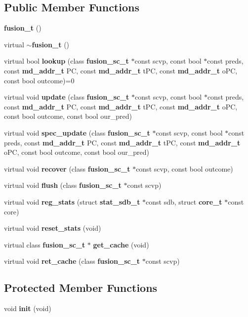 \subsection*{Public Member Functions}
\begin{CompactItemize}
\item 
{\bf fusion\_\-t} ()
\item 
virtual {\bf $\sim$fusion\_\-t} ()
\item 
virtual bool {\bf lookup} (class {\bf fusion\_\-sc\_\-t} $\ast$const scvp, const bool $\ast$const preds, const {\bf md\_\-addr\_\-t} PC, const {\bf md\_\-addr\_\-t} tPC, const {\bf md\_\-addr\_\-t} oPC, const bool outcome)=0
\item 
virtual void {\bf update} (class {\bf fusion\_\-sc\_\-t} $\ast$const scvp, const bool $\ast$const preds, const {\bf md\_\-addr\_\-t} PC, const {\bf md\_\-addr\_\-t} tPC, const {\bf md\_\-addr\_\-t} oPC, const bool outcome, const bool our\_\-pred)
\item 
virtual void {\bf spec\_\-update} (class {\bf fusion\_\-sc\_\-t} $\ast$const scvp, const bool $\ast$const preds, const {\bf md\_\-addr\_\-t} PC, const {\bf md\_\-addr\_\-t} tPC, const {\bf md\_\-addr\_\-t} oPC, const bool outcome, const bool our\_\-pred)
\item 
virtual void {\bf recover} (class {\bf fusion\_\-sc\_\-t} $\ast$const scvp, const bool outcome)
\item 
virtual void {\bf flush} (class {\bf fusion\_\-sc\_\-t} $\ast$const scvp)
\item 
virtual void {\bf reg\_\-stats} (struct {\bf stat\_\-sdb\_\-t} $\ast$const sdb, struct {\bf core\_\-t} $\ast$const core)
\item 
virtual void {\bf reset\_\-stats} (void)
\item 
virtual class {\bf fusion\_\-sc\_\-t} $\ast$ {\bf get\_\-cache} (void)
\item 
virtual void {\bf ret\_\-cache} (class {\bf fusion\_\-sc\_\-t} $\ast$const scvp)
\end{CompactItemize}
\subsection*{Protected Member Functions}
\begin{CompactItemize}
\item 
void {\bf init} (void)
\end{CompactItemize}
